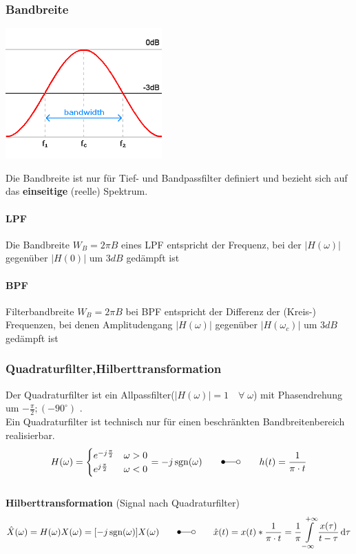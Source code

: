 	\subsubsection{Bandbreite }
	\begin{minipage}{7cm}
		\includegraphics[width=6cm]{bilder/filter_bandbreite.png}
	\end{minipage}
	\begin{minipage}{11cm}
		Die Bandbreite ist nur für Tief- und Bandpassfilter definiert und bezieht sich auf das \textbf{einseitige} (reelle) Spektrum.
		\paragraph{LPF}	
			Die Bandbreite $W_B = 2 \pi B$ eines LPF entspricht der Frequenz, bei der $|H(\omega)|$ gegenüber $|H(0)|$ um $3 dB$ gedämpft ist
		\paragraph{BPF}	
			Filterbandbreite $W_B = 2 \pi B$ bei BPF entspricht der Differenz der (Kreis-) Frequenzen, bei denen Amplitudengang $|H(\omega)|$ gegenüber $|H(\omega_c)|$ um $3 dB$ gedämpft ist
	\end{minipage}


	\subsubsection{Quadraturfilter,Hilberttransformation }
		\label{lti_quadratur}\label{lti_hilbert}
		Der Quadraturfilter ist ein Allpassfilter($ |H(\omega)| = 1 \quad \forall \; \omega $) mit
		Phasendrehung um $-\frac{\pi}{2};(-90^\circ)$ %
		.\\
		Ein Quadraturfilter ist technisch nur für einen beschränkten Bandbreitenbereich realisierbar.
		\[
			H(\omega) = \begin{cases}
             	e^{-j \frac{\pi}{2}} & \omega > 0 \\
             	e^{j \frac{\pi}{2}} & \omega < 0
             \end{cases} =
				-j \sgn(\omega)
				\qquad \Laplace \qquad h(t) = \frac{1}{\pi \cdot t}
		\]
		 \\
		 \textbf{Hilberttransformation} (Signal nach Quadraturfilter)
		\[
			\hat{X}(\omega) = H(\omega)X(\omega) = [-j \sgn(\omega)] X(\omega) \qquad \Laplace \qquad \hat{x}(t) = x(t) \ast \frac{1}{\pi \cdot t} = \frac{1}{\pi} \int\limits_{-\infty}^{+\infty} \frac{x(\tau)}{t-\tau} \diff \tau
		\]